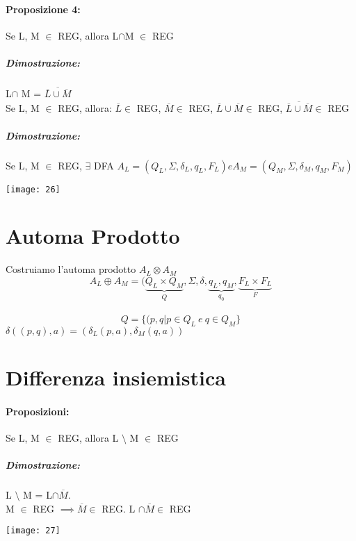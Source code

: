 \documentclass[12pt, a4paper, openany, oneside]{book}
\begin{document}
\paragraph{Proposizione 4: }Se L, M $\in$ REG, allora L$\cap$M $\in$ REG
\subparagraph{Dimostrazione: }L$\cap$ M = $\overline{\overline{L} \cup \overline{M}}$	\\
Se L, M $\in$ REG, allora: $\overline{L} \in$ REG, $\overline{M} \in$ REG, 
$\overline{L} \cup \overline{M} \in$ REG, $\overline{\overline{L}\cup\overline{M}} \in$ REG 
\subparagraph{Dimostrazione: }Se L, M $\in$ REG, $\exists$ DFA $A_{L}=(Q_{L}, 
\Sigma, \delta_{L},q_{L}, F_{L}) e A_{M} = (Q_{M}, \Sigma, \delta_{M}, q_{M}, F_{M})$
\begin{center}
\texttt{[image: 26]}
\end{center}	
\section{Automa Prodotto}
Costruiamo l'automa prodotto $A_{L} \otimes A_{M}$\\
\[A_{L} \oplus A_{M} = (\underbrace{Q_{L} \times Q_{M}}_{Q}, \Sigma, \delta, 
\underbrace{q_{L}, q_{M}}_{q_{0}}, \underbrace{F_{L}\times F_{L}}_{F} \]\\
\[Q = \{(p, q | p \in Q_{L}~ e ~ q\in Q_{M}\}\]
$\delta ((p, q), a) = (\delta_{L}(p,a), \delta_{M}(q,a))$
\section{Differenza insiemistica}
\paragraph{Proposizioni: }Se L, M $\in$ REG, allora L $\setminus$ M $\in$ REG
\subparagraph{Dimostrazione: }L $\setminus$ M = L$\cap \overline{M}$. \\
M $\in$ REG $\implies \overline{M} \in$ REG. L $\cap \overline{M} \in$ REG   
\begin{center}
\texttt{[image: 27]}
\end{center}           
\end{document}

